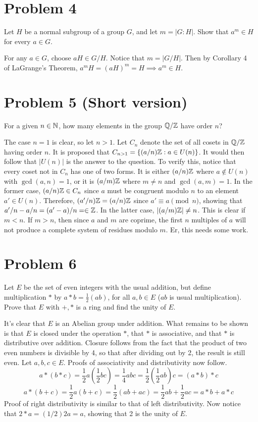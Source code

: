 \documentclass{article}
\begin{document}
\section*{Problem 4}

Let $H$ be a normal subgroup of a group $G$, and let $m=|G:H|$.
Show that $a^m\in H$ for every $a\in G$.

For any $a\in G$, choose $aH\in G/H$.  Notice that $m=|G/H|$.
Then by Corollary 4 of LaGrange's Theorem, $a^mH = (aH)^m = H\implies a^m\in H$.

\pagebreak
\section*{Problem 5 (Short version)}

For a given $n\in\mathbb{N}$, how many elements in the group
$\mathbb{Q}/\mathbb{Z}$ have order $n$?

The case $n=1$ is clear, so let $n>1$.
Let $C_n$ denote the set of all cosets in $\mathbb{Q}/\mathbb{Z}$ having order $n$.
It is proposed that 
$C_{n>1}=\{(a/n)\mathbb{Z}:a\in U(n)\}$.  It would
then follow that $|U(n)|$ is the answer to the question.
To verify this, notice that every coset not
in $C_n$ has one of two forms.  It is either $(a/n)\mathbb{Z}$
where $a\not\in U(n)$ with $\gcd(a,n)=1$, or it is $(a/m)\mathbb{Z}$
where $m\neq n$ and $\gcd(a,m)=1$.  In the former case,
$(a/n)\mathbb{Z}\in C_n$ since $a$ must be congruent modulo $n$
to an element $a'\in U(n)$.  Therefore, $(a'/n)\mathbb{Z}=(a/n)\mathbb{Z}$
since $a'\equiv a\pmod{n}$, showing that $a'/n-a/n=(a'-a)/n=\in\mathbb{Z}$.
In the latter case, $|(a/m)\mathbb{Z}|\neq n$.  This is clear if $m<n$.
If $m>n$, then since $a$ and $m$ are coprime, the first $n$
multiples of $a$ will not produce a complete system of residues
modulo $m$.  Er, this needs some work.

\section*{Problem 6}

Let $E$ be the set of even integers with the usual addition,
but define multiplication $*$ by $a*b=\frac{1}{2}(ab)$,
for all $a,b\in E$ ($ab$ is usual multiplication).
Prove that $E$ with $+,*$ is a ring and find the unity of $E$.

It's clear that $E$ is an Abelian group under addition.
What remains to be shown is that $E$ is closed under the
operation $*$, that $*$ is associative, and that $*$ is
distributive over addition.
Closure follows from the fact that the product of two even
numbers is divisible by 4, so that after dividing out by 2,
the result is still even.  Let $a,b,c\in E$.
Proofs of associativity and distributivity now follow.
\begin{equation*}
a*(b*c)=\frac{1}{2}a\left(\frac{1}{2}bc\right)
 = \frac{1}{4}abc
 = \frac{1}{2}\left(\frac{1}{2}ab\right)c = (a*b)*c
\end{equation*}
\begin{equation*}
a*(b+c)=\frac{1}{2}a(b+c)=\frac{1}{2}(ab+ac)=\frac{1}{2}ab+\frac{1}{2}ac=a*b+a*c
\end{equation*}
Proof of right distributivity is similar to that of left distributivity.
Now notice that $2*a=(1/2)2a=a$, showing that 2 is the unity of $E$.
\end{document}
